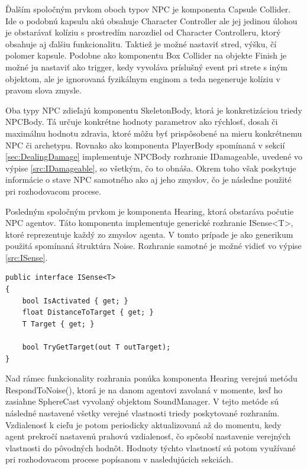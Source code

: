 \documentclass[slovak, master]{diploma}
\begin{document}
Ďalším spoločným prvkom oboch typov NPC je komponenta Capsule Collider. Ide o podobnú kapsulu akú obsahuje Character Controller ale jej jedinou úlohou je obstarávať kolíziu s prostredím narozdiel od Character Controlleru, ktorý obsahuje aj ďalšiu funkcionalitu. Taktiež je možné nastaviť stred, výšku, čí polomer kapsule. Podobne ako komponentu Box Collider na objekte Finish je možné ju nastaviť ako trigger, kedy vyvoláva príslušný event pri strete s iným objektom, ale je ignorovaná fyzikálnym enginom a teda negeneruje kolíziu v pravom slova zmysle.

Oba typy NPC zdieľajú komponentu SkeletonBody, ktorá je konkretizáciou triedy NPCBody. Tá určuje konkrétne hodnoty parametrov ako rýchlosť, dosah či maximálnu hodnotu zdravia, ktoré môžu byť prispôsobené na mieru konkrétnemu NPC či archetypu. Rovnako ako komponenta \mbox{PlayerBody} spomínaná v sekcií \ref{sec:DealingDamage} implementuje NPCBody rozhranie IDamageable, uvedené vo výpise \ref{src:IDamageable}, so všetkým, čo to obnáša. Okrem toho však poskytuje informácie o stave NPC samotného ako aj jeho zmyslov, čo je následne použité pri rozhodovacom procese.

Posledným spoločným prvkom je komponenta Hearing, ktorá obstaráva počutie NPC agentov. Táto komponenta implementuje generické rozhranie ISense<T>, ktoré reprezentuje každý zo zmyslov agenta. V tomto prípade je ako generikum použitá spomínaná štruktúra Noise. Rozhranie samotné je možné vidieť vo výpise \ref{src:ISense}.

\vspace{8pt}
\begin{lstlisting}[label=src:ISense,caption={Generické rozhranie ISense}]
public interface ISense<T>
{
    bool IsActivated { get; }
    float DistanceToTarget { get; }
    T Target { get; }

    bool TryGetTarget(out T outTarget);
}
\end{lstlisting}

Nad rámec funkcionality rozhrania ponúka komponenta Hearing verejnú metódu RespondToNoise(), ktorá je na danom agentovi zavolaná v momente, keď ho zasiahne SphereCast vyvolaný objektom SoundManager. V tejto metóde sú následné nastavené všetky verejné vlastnosti triedy poskytované rozhraním. Vzdialenosť k cieľu je potom periodicky aktualizovaná až do momentu, kedy agent prekročí nastavenú prahovú vzdialenosť, čo spôsobí nastavenie verejných vlastnosti do pôvodných hodnôt. Hodnoty týchto vlastností sú potom využívané pri rozhodovacom procese popísanom v nasledujúcich sekciách.
\end{document}
